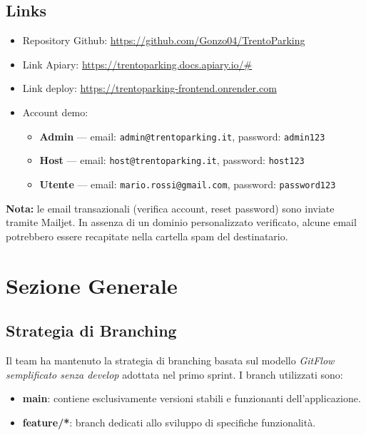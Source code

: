 \documentclass[a4paper,12pt]{article}
\begin{document}
\subsection{Links}

\begin{itemize}
  \item Repository Github: \url{https://github.com/Gonzo04/TrentoParking}
  \item Link Apiary: \url{https://trentoparking.docs.apiary.io/#}
  \item Link deploy: \url{https://trentoparking-frontend.onrender.com}
  \item Account demo:
  \begin{itemize}
    \item \textbf{Admin}  --- email: \texttt{admin@trentoparking.it}, password: \texttt{admin123}
    \item \textbf{Host}   --- email: \texttt{host@trentoparking.it}, password: \texttt{host123}
    \item \textbf{Utente} --- email: \texttt{mario.rossi@gmail.com}, password: \texttt{password123}
  \end{itemize}
\end{itemize}

\textbf{Nota:} le email transazionali (verifica account, reset password) sono inviate
tramite Mailjet. In assenza di un dominio personalizzato verificato, alcune email
potrebbero essere recapitate nella cartella spam del destinatario.

\section{Sezione Generale}

\subsection{Strategia di Branching}

Il team ha mantenuto la strategia di branching basata sul modello \textit{GitFlow
semplificato senza develop} adottata nel primo sprint.
I branch utilizzati sono:

\begin{itemize}
  \item \textbf{main}: contiene esclusivamente versioni stabili e funzionanti
        dell'applicazione.
  \item \textbf{feature/*}: branch dedicati allo sviluppo di specifiche funzionalità.
\end{itemize}
\end{document}
